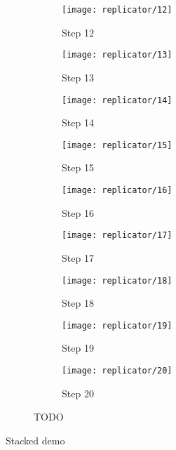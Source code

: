 \begin{figure}[!ht]
    \ContinuedFloat
    \centering
    \begin{subfigure}{0.32\textwidth}
        \centering
        \texttt{[image: replicator/12]}
        \caption{Step 12}
    \end{subfigure}
    \begin{subfigure}{0.32\textwidth}
        \centering
        \texttt{[image: replicator/13]}
        \caption{Step 13}
    \end{subfigure}
    \begin{subfigure}{0.32\textwidth}
        \centering
        \texttt{[image: replicator/14]}
        \caption{Step 14}
    \end{subfigure}
    \par\bigskip
    \begin{subfigure}{0.32\textwidth}
        \centering
        \texttt{[image: replicator/15]}
        \caption{Step 15}
    \end{subfigure}
    \begin{subfigure}{0.32\textwidth}
        \centering
        \texttt{[image: replicator/16]}
        \caption{Step 16}
    \end{subfigure}
    \begin{subfigure}{0.32\textwidth}
        \centering
        \texttt{[image: replicator/17]}
        \caption{Step 17}
    \end{subfigure}
    \par\bigskip
    \begin{subfigure}{0.32\textwidth}
        \centering
        \texttt{[image: replicator/18]}
        \caption{Step 18}
    \end{subfigure}
    \begin{subfigure}{0.32\textwidth}
        \centering
        \texttt{[image: replicator/19]}
        \caption{Step 19}
    \end{subfigure}
    \begin{subfigure}{0.32\textwidth}
        \centering
        \texttt{[image: replicator/20]}
        \caption{Step 20}
    \end{subfigure}
    \caption[Replicator] {
        TODO
    }
    \label{fig:replicator}
\end{figure}

\TODO
Stacked demo
